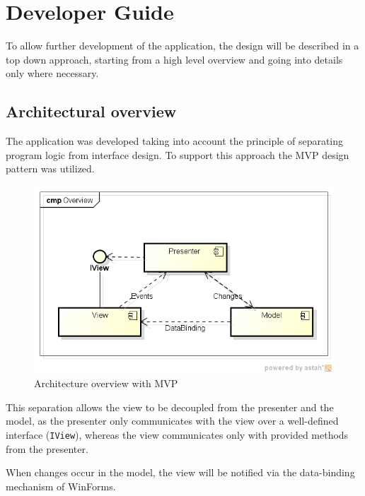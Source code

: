 \chapter{Developer Guide}\label{ch:developer_guide} %

To allow further development of the application, the design will be described in a top down approach, starting from a high level overview and going into details only where necessary.

\section{Architectural overview}
\label{sec:architectural overview}

The application was developed taking into account the principle of separating program logic from interface design. To support this approach the \acf{MVP} design pattern was utilized.

\begin{figure}[H]
\begin{center}
\includegraphics[width=\textwidth]{gfx/architecture_overview.png}
\caption{Architecture overview with \ac{MVP}}
\label{fig:architecture_overview}
\end{center}
\end{figure}

This separation allows the view to be decoupled from the presenter and the model, as the presenter only communicates with the view over a well-defined interface (\texttt{IView}), whereas the view communicates only with provided methods from the presenter.

When changes occur in the model, the view will be notified via the data-binding mechanism of WinForms.

